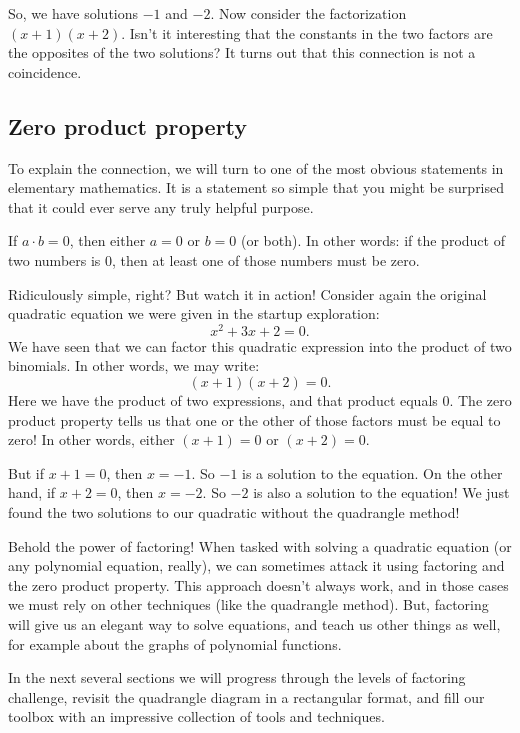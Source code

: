 So, we have solutions $-1$ and $-2$. Now consider the factorization $(x+1)(x+2)$. Isn't it interesting that the constants in the two factors are the opposites of the two solutions? It turns out that this connection is not a coincidence.

\subsection{Zero product property}

To explain the connection, we will turn to one of the most obvious statements in elementary mathematics. It is a statement so simple that you might be surprised that it could ever serve any truly helpful purpose.

\begin{boxeddef}
If $a \cdot b = 0$, then either $a=0$ or $b=0$ (or both). In other words: if the product of two numbers is 0, then at least one of those numbers must be zero.
\end{boxeddef}

Ridiculously simple, right? But watch it in action! Consider again the original quadratic equation we were given in the startup exploration:
\[x^2 + 3x + 2 = 0.\]
We have seen that we can factor this quadratic expression into the product of two binomials. In other words, we may write:
\[(x+1)(x+2) = 0.\]
Here we have the product of two expressions, and that product equals 0. The zero product property tells us that one or the other of those factors must be equal to zero! In other words, either $(x+1) = 0$ or $(x+2)=0$.

But if $x+1=0$, then $x=-1$. So $-1$ is a solution to the equation. On the other hand, if $x+2=0$, then $x=-2$. So $-2$ is also a solution to the equation! We just found the two solutions to our quadratic without the quadrangle method!

Behold the power of factoring! When tasked with solving a quadratic equation (or any polynomial equation, really), we can sometimes attack it using factoring and the zero product property. This approach doesn't always work, and in those cases we must rely on other techniques (like the quadrangle method). But, factoring will give us an elegant way to solve equations, and teach us other things as well, for example about the graphs of polynomial functions.

In the next several sections we will progress through the levels of factoring challenge, revisit the quadrangle diagram in a rectangular format, and fill our toolbox with an impressive collection of tools and techniques.

